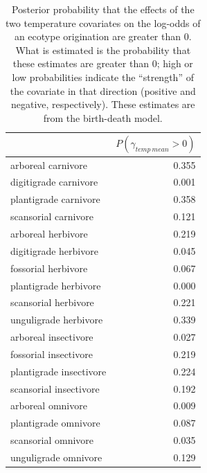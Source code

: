 \documentclass[12pt,letterpaper]{article}
\begin{document}
\begin{table}[ht]
  \centering
  \caption[Posterior probablity of effects of temperature on origination]{Posterior probability that the effects of the two temperature covariates on the log-odds of an ecotype origination are greater than 0. What is estimated is the probability that these estimates are greater than 0; high or low probabilities indicate the ``strength'' of the covariate in that direction (positive and negative, respectively). These estimates are from the birth-death model.}
  \label{tab:origin_temp}
  \begin{tabular}{ l r }
    \hline
    & \(P(\gamma_{temp\ mean} > 0)\) \\
    \hline
    arboreal carnivore & 0.355 \\ 
    digitigrade carnivore & 0.001 \\ 
    plantigrade carnivore & 0.358 \\ 
    scansorial carnivore & 0.121 \\ 
    arboreal herbivore & 0.219 \\ 
    digitigrade herbivore & 0.045 \\ 
    fossorial herbivore & 0.067 \\ 
    plantigrade herbivore & 0.000 \\ 
    scansorial herbivore & 0.221 \\ 
    unguligrade herbivore & 0.339 \\ 
    arboreal insectivore & 0.027 \\ 
    fossorial insectivore & 0.219 \\ 
    plantigrade insectivore & 0.224 \\ 
    scansorial insectivore & 0.192 \\ 
    arboreal omnivore & 0.009 \\ 
    plantigrade omnivore & 0.087 \\ 
    scansorial omnivore & 0.035 \\ 
    unguligrade omnivore & 0.129 \\ 
    \hline
  \end{tabular}
\end{table}
\end{document}
